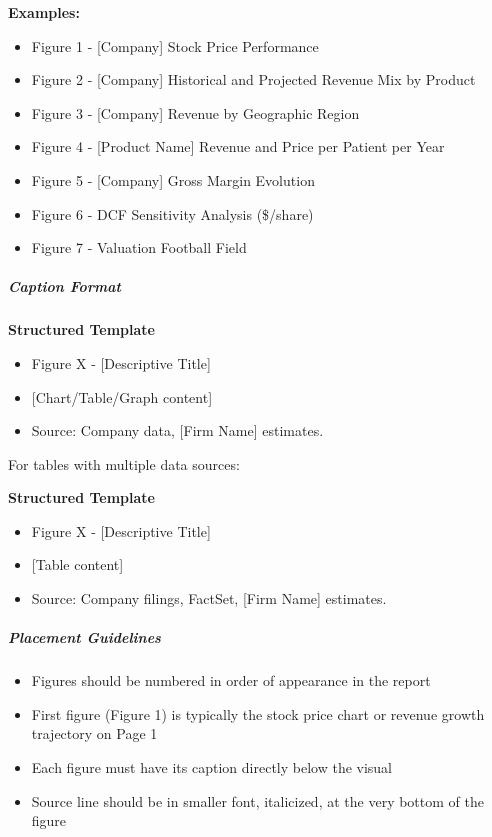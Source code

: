\documentclass[11pt]{article}
\begin{document}
\textbf{Examples:}

\begin{itemize}[leftmargin=*,itemsep=2pt,topsep=2pt]
\item {} Figure 1 - [Company] Stock Price Performance
\item {} Figure 2 - [Company] Historical and Projected Revenue Mix by Product
\item {} Figure 3 - [Company] Revenue by Geographic Region
\item {} Figure 4 - [Product Name] Revenue and Price per Patient per Year
\item {} Figure 5 - [Company] Gross Margin Evolution
\item {} Figure 6 - DCF Sensitivity Analysis (\$/share)
\item {} Figure 7 - Valuation Football Field
\end{itemize}

\subparagraph{Caption Format}\mbox{}\par

\textbf{Structured Template}
\begin{itemize}[leftmargin=*,itemsep=2pt,topsep=2pt]
\item {} Figure X - [Descriptive Title]
\item {} [Chart/Table/Graph content]
\item {} Source: Company data, [Firm Name] estimates.
\end{itemize}

For tables with multiple data sources:

\textbf{Structured Template}
\begin{itemize}[leftmargin=*,itemsep=2pt,topsep=2pt]
\item {} Figure X - [Descriptive Title]
\item {} [Table content]
\item {} Source: Company filings, FactSet, [Firm Name] estimates.
\end{itemize}

\subparagraph{Placement Guidelines}\mbox{}\par

\begin{itemize}[leftmargin=*,itemsep=2pt,topsep=2pt]
\item {} Figures should be numbered in order of appearance in the report
\item {} First figure (Figure 1) is typically the stock price chart or revenue growth trajectory on Page 1
\item {} Each figure must have its caption directly below the visual
\item {} Source line should be in smaller font, italicized, at the very bottom of the figure
\end{itemize}
\end{document}
